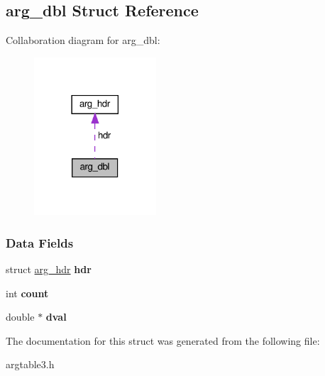 \hypertarget{structarg__dbl}{}\subsection{arg\+\_\+dbl Struct Reference}
\label{structarg__dbl}


Collaboration diagram for arg\+\_\+dbl\+:\nopagebreak
\begin{figure}[H]
\begin{center}
\leavevmode
\includegraphics[width=129pt]{structarg__dbl__coll__graph}
\end{center}
\end{figure}
\subsubsection*{Data Fields}
\begin{DoxyCompactItemize}
\item 
\mbox{\label{structarg__dbl_a0bf5455c02b70f1afc408597e81f8764}} 
struct \hyperlink{structarg__hdr}{arg\+\_\+hdr} {\bfseries hdr}
\item 
\mbox{\label{structarg__dbl_ab94e4d551bc7888e444dc1c7d040dfbb}} 
int {\bfseries count}
\item 
\mbox{\label{structarg__dbl_ab928e87ab3a1ab5617b798fe02adfca1}} 
double $\ast$ {\bfseries dval}
\end{DoxyCompactItemize}


The documentation for this struct was generated from the following file\+:\begin{DoxyCompactItemize}
\item 
argtable3.\+h\end{DoxyCompactItemize}
